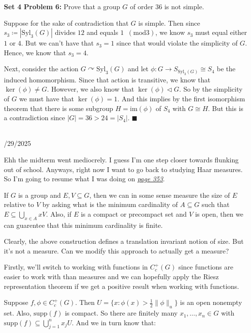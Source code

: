 \documentclass{book}
\newcommand{\inLinkRap}[2]{{\color{blue}\hyperlink{#1}{\textit{#2}}}}
\newcommand{\hTwo}{%
\color{Black}%
   \fontsize{13}{15}\selectfont%
}
\newcommand{\HexOne}{%
   \color{Purple}%
   \fontsize{12}{13}\selectfont%
}
\newenvironment{myIndent}{%
   \begin{adjustwidth}{2.5em}{0em}%
}{%
   \end{adjustwidth}%
}
\newcommand{\blab}[1]{\textbf{#1}}
\newcommand{\myIm}{\mathrm{im}}
\newcommand{\supp}{\mathrm{supp}}
\newcommand{\mMod}[1]{\phantom{a}(\mathrel{\mathrm{mod}} #1)}
\newcommand{\Syl}{\mathrm{Syl}}
\newcommand{\mySepTwo}[1][.]{%
   {\noindent\color{#1}{\rule{6.5in}{0.5mm}}}\\%
}
\newcommand{\retTwo}{\hfill\bigbreak}
\newcommand{\dispDate}[1]{{
   \color{Black}%
   \fontsize{20}{18}\selectfont%
   #1\retTwo
}}
\begin{document}
\blab{Set 4 Problem 6:} Prove that a group $G$ of order $36$ is not simple.\newpage

\begin{myIndent}\HexOne
	Suppose for the sake of contradiction that $G$ is simple. Then since $s_3 \coloneqq |\Syl_3(G)|$ divides $12$ and equals $1 \mMod{3}$, we know $s_3$ must equal either $1$ or $4$. But we can't have that $s_3 = 1$ since that would violate the simplicity of $G$. Hence, we know that $s_3 = 4$.\retTwo

	Next, consider the action $G \curvearrowright \Syl_3(G)$ and let $\phi: G \to S_{\Syl_3(G)} \cong S_4$ be the induced homomorphism. Since that action is transitive, we know that $\ker(\phi) \neq G$. However, we also know that $\ker(\phi) \lhd G$. So by the simplicity of $G$ we must have that $\ker(\phi) = 1$. And this implies by the first isomorphism theorem that there is some subgroup $H = \myIm(\phi)$ of $S_4$ with $G \cong H$. But this is a contradiction since $|G| = 36 > 24 = |S_4|$. $\blacksquare$\retTwo
\end{myIndent}

\hTwo\mySepTwo

\dispDate{10/29/2025}

Ehh the midterm went mediocrely. I guess I'm one step closer towards flunking out of school. Anyways, right now I want to go back to studying Haar measures. So \hypertarget{idk reference 4}{I'm} going to resume what I was doing on \inLinkRap{page 353 reference}{page 353}.\retTwo

If $G$ is a group and $E, V \subseteq G$, then we can in some sense measure the size of $E$ relative to $V$ by asking what is the minimum cardinality of $A \subseteq G$ such that $E \subseteq \bigcup_{x \in A} xV$. Also, if $E$ is a compact or precompact set and $V$ is open, then we can guarentee that this minimum cardinality is finite.\retTwo

Clearly, the above construction defines a translation invariant notion of size. But it's not a measure. Can we modify this approach to actually get a measure?\retTwo

Firstly, we'll switch to working with functions in $C_c^+(G)$ since functions are easier to work with than measures and we can hopefully apply the Riesz representation theorem if we get a positive result when working with functions.\retTwo

Suppose $f, \phi \in C_c^+(G)$. Then $U = \{x : \phi(x) > \frac{1}{2}\|\phi\|_u\}$ is an open nonempty set. Also, $\supp(f)$ is compact. So there are finitely many $x_1, \ldots, x_n \in G$ with $\supp(f) \subseteq \bigcup_{j=1}^n x_jU$. And we in turn know that:
\end{document}
